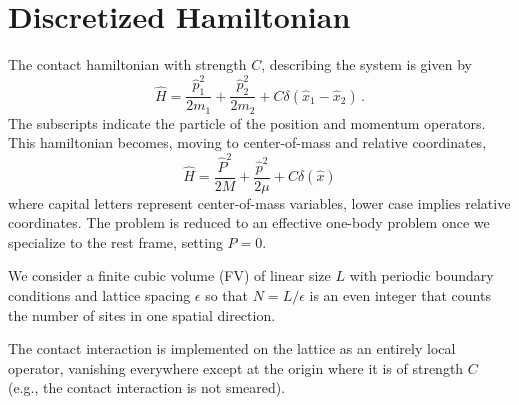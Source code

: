 \section{Discretized Hamiltonian}\label{sec:hamiltonian}

The contact hamiltonian with strength $C$, describing the system is given by
\begin{equation}
    \label{eq:particle hamiltonian}
    \hat H = \frac{\hat p_1^2}{2 m_1} + \frac{\hat p_2^2}{2 m_2} + C \delta(\hat x_1 - \hat x_2)
    \, .
\end{equation}
The subscripts indicate the particle of the position and momentum operators.
This hamiltonian becomes, moving to center-of-mass and relative coordinates,
\begin{equation}
    \label{eq:hamiltonian}
    \hat H = \frac{\hat P^2}{2 M} + \frac{\hat p^2}{2 \mu} + C \delta(\hat x)
\end{equation}
where capital letters represent center-of-mass variables, lower case implies relative coordinates.
The problem is reduced to an effective one-body problem once we specialize to the rest frame, setting $P=0$.

We consider a finite cubic volume (FV) of linear size $L$ with periodic boundary conditions and lattice spacing $\epsilon$ so that $N=L/\epsilon$ is an even integer that counts the number of sites in one spatial direction.

The contact interaction is implemented on the lattice as an entirely local operator, vanishing everywhere except at the origin where it is of strength $C$ (e.g., the contact interaction is not smeared).

